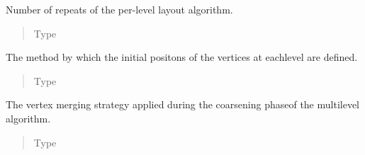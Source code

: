 \documentclass[letterpaper,10pt,english]{sphinxmanual}
\begin{document}
\begin{fulllineitems}
\begin{fulllineitems}
\begin{quote}
\begin{description}
\end{description}\end{quote}

\end{fulllineitems}



\begin{fulllineitems}
Number of repeats of the per-level layout algorithm.
\begin{quote}\begin{description}
\item[{Type}] \leavevmode
{}

\end{description}\end{quote}

\end{fulllineitems}



\begin{fulllineitems}
The  method  by  which  the  initial  positons  of  the  vertices  at  eachlevel are defined.
\begin{quote}\begin{description}
\item[{Type}] \leavevmode
{\hyperref[\detokenize{documentation:tmap.Placer}]{}}

\end{description}\end{quote}

\end{fulllineitems}



\begin{fulllineitems}
The vertex merging strategy applied during the coarsening phaseof the multilevel algorithm.
\begin{quote}\begin{description}
\item[{Type}] \leavevmode
{\hyperref[\detokenize{documentation:tmap.Merger}]{}}

\end{description}\end{quote}

\end{fulllineitems}




\end{fulllineitems}
\end{document}
